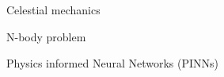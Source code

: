 \documentclass[draft]{agujournal2019}
\begin{document}



\begin{keypoints}
\item Celestial mechanics
\item N-body problem
\item Physics informed Neural Networks (PINNs)
\end{keypoints}

%
%

%
%


\begin{abstract}

\end{abstract}

%
%
\end{document}
